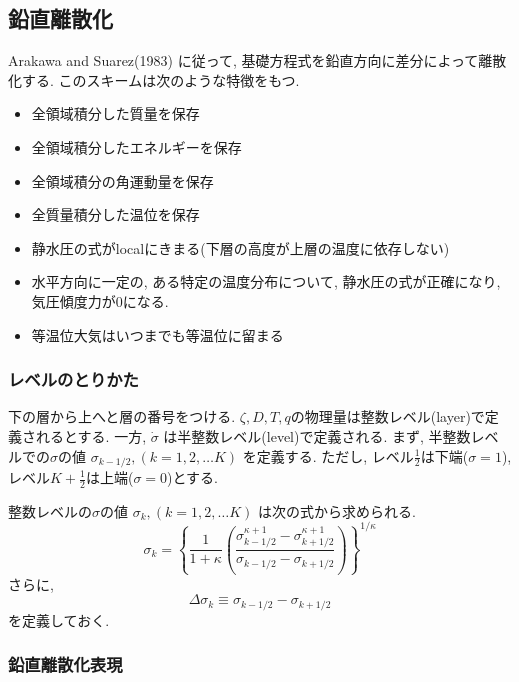 ﻿
\subsection{鉛直離散化}

Arakawa and Suarez(1983) に従って, 
基礎方程式を鉛直方向に差分によって離散化する.
このスキームは次のような特徴をもつ.
%
\begin{itemize}
\item 全領域積分した質量を保存
\item 全領域積分したエネルギーを保存
\item 全領域積分の角運動量を保存
\item 全質量積分した温位を保存
\item 静水圧の式がlocalにきまる(下層の高度が上層の温度に依存しない)
\item 水平方向に一定の, ある特定の温度分布について,
      静水圧の式が正確になり, 気圧傾度力が0になる.
\item 等温位大気はいつまでも等温位に留まる
\end{itemize}      

\subsubsection{レベルのとりかた}

下の層から上へと層の番号をつける.
$\zeta,D,T,q$の物理量は整数レベル(layer)で定義されるとする.
一方, $\dot{\sigma}$ は半整数レベル(level)で定義される.
%
まず, 半整数レベルでの$\sigma$の値
$\sigma_{k-1/2}, (k=1,2,\ldots K)$
を定義する.
%
ただし, レベル$\frac{1}{2}$は下端($\sigma=1$),
レベル$K+\frac{1}{2}$は上端($\sigma=0$)とする.

整数レベルの$\sigma$の値
$\sigma_k, (k=1,2,\ldots K)$
は次の式から求められる.
%
\begin{equation}
 \label{しぐま定義}
 \sigma_k = \left\{ \frac{1}{1+\kappa}
                     \left( \frac{  \sigma^{\kappa +1}_{k-1/2}
                                  - \sigma^{\kappa +1}_{k+1/2}      }
                                  { \sigma_{k-1/2} - \sigma_{k+1/2} }
                     \right)
              \right\}^{1/\kappa}
\end{equation}
%
さらに,
\begin{equation}
  \label{しぐま厚さ}
  \Delta \sigma_k \equiv \sigma_{k-1/2} - \sigma_{k+1/2}
\end{equation}
を定義しておく.

\subsubsection{鉛直離散化表現}

